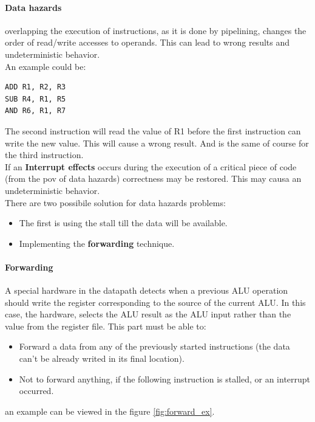\documentclass[12pt]{article}
\begin{document}
\paragraph{Data hazards} overlapping the execution of instructions, as it is done by pipelining, changes the order of read/write accesses to operands. This can lead to wrong results and undeterministic behavior.\\
An example could be:\\
\begin{lstlisting}
ADD R1, R2, R3
SUB R4, R1, R5
AND R6, R1, R7
\end{lstlisting}
The second instruction will read the value of R1 before the first instruction can write the new value. This will cause a wrong result. And is the same of course for the third instruction.\\
If an \textbf{Interrupt effects} occurs during the execution of a critical piece of code (from the pov of data hazards) correctness may be restored. This may causa an undeterministic behavior.\\
There are two possibile solution for data hazards problems:
\begin{itemize}
  \item The first is using the stall till the data will be available.
  \item Implementing the \textbf{forwarding} technique.
\end{itemize}

\paragraph{Forwarding} A special hardware in the datapath detects when a previous ALU operation should write the register corresponding to the source of the current ALU. In this case, the hardware, selects the ALU result as the ALU input rather than the value from the register file. This part must be able to:
\begin{itemize}
  \item Forward a data from any of the previously started instructions (the data can't be already writed in its final location).
  \item Not to forward anything, if the following instruction is stalled, or an interrupt occurred.
\end{itemize}
an example can be viewed in the figure \ref{fig:forward_ex}.
\end{document}
